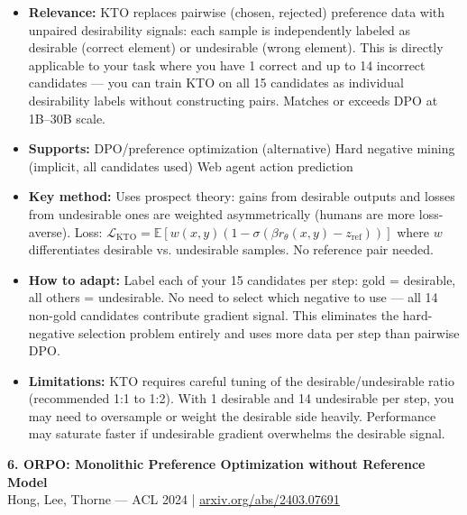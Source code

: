 \documentclass[pdflatex,sn-mathphys-num]{sn-jnl}
\theoremstyle{thmstyleone}
\theoremstyle{thmstyletwo}
\theoremstyle{thmstylethree}
\begin{document}
\begin{itemize}
    \item \textbf{Relevance:} KTO replaces pairwise (chosen, rejected) preference data with unpaired desirability signals: each sample is independently labeled as desirable (correct element) or undesirable (wrong element). This is directly applicable to your task where you have 1 correct and up to 14 incorrect candidates --- you can train KTO on all 15 candidates as individual desirability labels without constructing pairs. Matches or exceeds DPO at 1B--30B scale.
    \item \textbf{Supports:} \checkmark DPO/preference optimization (alternative) \checkmark Hard negative mining (implicit, all candidates used) \checkmark Web agent action prediction
    \item \textbf{Key method:} Uses prospect theory: gains from desirable outputs and losses from undesirable ones are weighted asymmetrically (humans are more loss-averse). Loss: $\mathcal{L}_\text{KTO} = \mathbb{E}\left[w(x,y)\left(1 - \sigma\left(\beta r_\theta(x,y) - z_{\text{ref}}\right)\right)\right]$ where $w$ differentiates desirable vs. undesirable samples. No reference pair needed.
    \item \textbf{How to adapt:} Label each of your 15 candidates per step: gold = desirable, all others = undesirable. No need to select which negative to use --- all 14 non-gold candidates contribute gradient signal. This eliminates the hard-negative selection problem entirely and uses more data per step than pairwise DPO.
    \item \textbf{Limitations:} KTO requires careful tuning of the desirable/undesirable ratio (recommended 1:1 to 1:2). With 1 desirable and 14 undesirable per step, you may need to oversample or weight the desirable side heavily. Performance may saturate faster if undesirable gradient overwhelms the desirable signal.
\end{itemize}

\textbf{6. ORPO: Monolithic Preference Optimization without Reference Model} \\
Hong, Lee, Thorne --- ACL 2024 | \href{https://arxiv.org/abs/2403.07691}{arxiv.org/abs/2403.07691}
\end{document}
